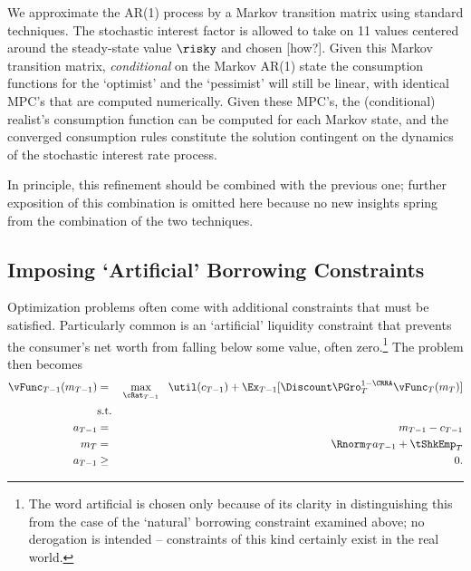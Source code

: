\documentclass[titlepage]{\econtex}
\begin{document}

We approximate the AR(1) process by a Markov transition matrix using standard techniques.  The stochastic interest factor is allowed to take 
on 11 values centered around the steady-state value $\risky$ and chosen [how?].  Given this Markov transition matrix,
\textit{conditional} on the Markov AR(1) state the consumption functions for the `optimist' and the `pessimist' will still be linear, 
with identical MPC's that are computed numerically.  Given these MPC's, the (conditional) realist's consumption function can be computed for each Markov state, and the converged consumption rules constitute the solution contingent on the dynamics of the stochastic
interest rate process.  

In principle, this refinement should be combined with the previous one;
further exposition of this combination is omitted here because no new
insights spring from the combination of the two techniques.



\hypertarget{Imposing-Artificial-Borrowing-Constraints}{}
\subsection{Imposing `Artificial' Borrowing Constraints}

Optimization problems often come with additional constraints that must
be satisfied.  Particularly common is an `artificial' liquidity constraint that
prevents the consumer's net worth from falling below some value, often
zero.\footnote{The word artificial is chosen only because of its clarity in distinguishing
  this from the case of the `natural' borrowing constraint examined above; no derogation is
  intended -- constraints of this kind certainly exist in the real world.}  The problem then becomes
\begin{eqnarray*}
  {\vFunc}_{T-1}({m}_{T-1}) & = & \max_{\cRat_{T-1}} ~~ \util({c}_{T-1}) + \Ex_{T-1} [\Discount \PGro_{T}^{1-\CRRA}{\vFunc}_{T}({m}_{T})] \label{eq:ConstrArt}
  \\ & \mbox{s.t.}&  \nonumber
  \\ {a}_{T-1} & = & {m}_{T-1} - {c}_{T-1}
  \\ {m}_{T} & = & \Rnorm_{T} {a}_{T-1} + \tShkEmp_{T}
  \\ {a}_{T-1} & \geq & 0 .
\end{eqnarray*}
\end{document}
